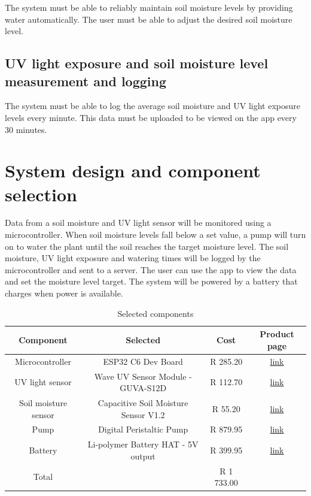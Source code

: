 The system must be able to reliably maintain soil moisture levels by providing water automatically. The user must be able to adjust the desired soil moisture level.

\subsection{UV light exposure and soil moisture level
measurement and logging}
The system must be able to log the average soil moisture and UV light exposure levels every minute. This data must be uploaded to be viewed on the app every 30 minutes.

\section{System design and component selection}

Data from a soil moisture and UV light sensor will be monitored using a microcontroller. When soil moisture levels fall below a set value, a pump will turn on to water the plant until the soil reaches the target moisture level. The soil moisture, UV light exposure and watering times will be logged by the microcontroller and sent to a server. The user can use the app to view the data and set the moisture level target. The system will be powered by a battery that charges when power is available.

\begin{table}[!h]
    \centering
    \begin{tabular}{|c|c|c|c|}
        \hline
        Component & Selected & Cost & Product page \\
        \hline
        Microcontroller &  ESP32 C6 Dev Board & R 285.20 & \href{https://www.robotics.org.za/ESP32-C6-DEV}{link} \\
        UV light sensor & Wave UV Sensor Module - GUVA-S12D & R 112.70 & \href{https://www.robotics.org.za/W9537}{link} \\
        Soil moisture sensor & Capacitive Soil Moisture Sensor V1.2 & R 55.20 & \href{https://www.robotics.org.za/CAP-SW-12}{link} \\
        Pump & Digital Peristaltic Pump & R 879.95 & \href{https://www.diyelectronics.co.za/store/dfrobot/2119-digital-peristaltic-pump.html?search_query=PERISTALTIC+PUMP&results=4}{link} \\
        Battery & Li-polymer Battery HAT - 5V output & R 399.95 & \href{https://www.diyelectronics.co.za/store/hats/2726-lipo-battery-hat-5v-output.html?search_query=Li-polymer+Battery+HAT&results=14}{link}\\
        \hline
        Total & & R 1 733.00 & \\
        \hline
    \end{tabular}
    \caption{Selected components}
    \label{tab:components_selected}
\end{table}

